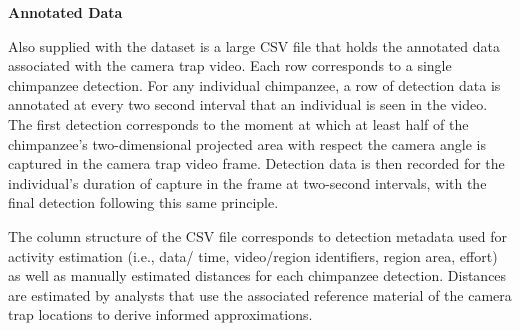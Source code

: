 \vspace{5mm}
\textbf{Annotated Data}

Also supplied with the dataset is a large CSV file that holds the annotated data associated with
the camera trap video.
Each row corresponds to a single chimpanzee detection.
For any individual chimpanzee, a row of detection data is annotated at every two second interval
that an individual is seen in the video.
The first detection corresponds to the moment at which at least half of the chimpanzee's
two-dimensional projected area with respect the camera angle is captured in the camera trap
video frame.
Detection data is then recorded for the individual's duration of capture in the frame at two-second intervals,
with the final detection following this same principle.

The column structure of the CSV file corresponds to detection metadata used for activity estimation
(i.e., data/ time, video/region identifiers, region area, effort) as well as manually estimated
distances for each chimpanzee detection.
Distances are estimated by analysts that use the associated reference material of the camera
trap locations to derive informed approximations.

